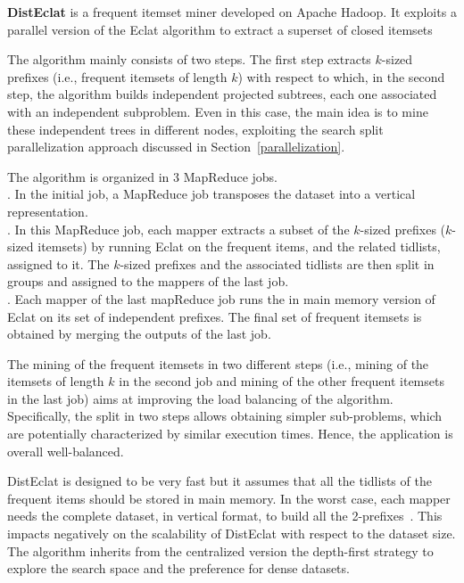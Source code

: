 \documentclass[preprint,review,12pt]{elsarticle}
\begin{document}
{\bf DistEclat} is a frequent itemset miner developed on Apache Hadoop. It exploits
a parallel version of the Eclat algorithm to extract a superset of closed itemsets

The algorithm mainly consists of two steps. The first step extracts $k$-sized prefixes (i.e., frequent itemsets of length $k$) with respect to which, in
the second step, the algorithm builds independent projected subtrees, each one associated with an independent subproblem. Even in this case,
the main idea is to mine these independent trees in different nodes, exploiting the search split parallelization approach discussed in 
Section~\ref{parallelization}. 

The algorithm is organized in 3 MapReduce jobs. \\ 
. In the initial job, a MapReduce job transposes
the dataset into a vertical representation. \\
. In this MapReduce job, each mapper extracts a subset of the $k$-sized prefixes ($k$-sized itemsets)
by running Eclat on the frequent items, and the related tidlists, assigned to it. The $k$-sized prefixes and the associated tidlists are then split in groups and assigned to the mappers of the last job.  \\
. Each mapper of the last mapReduce job runs the in main memory version of Eclat 
on its set of independent prefixes. The final set of frequent itemsets is obtained by merging the outputs of the last job. 

The mining of the frequent itemsets in two different steps (i.e., mining of the itemsets of length $k$ in the second job and mining of the other frequent itemsets in the last job) aims at improving the load balancing of the algorithm. 
Specifically, the split in two steps allows obtaining simpler sub-problems, which are potentially characterized by similar execution times. Hence, the application is overall well-balanced.

DistEclat is designed to be very fast but it assumes that all the tidlists of the frequent items should be stored in main memory.
In the worst case, each mapper needs the complete dataset, in vertical format, to build all the 2-prefixes~\cite{bigfim}. This impacts 
negatively on the scalability of DistEclat with respect to the dataset size.
The algorithm inherits from the centralized version the depth-first strategy to
explore the search space and the preference for dense datasets.
\end{document}
